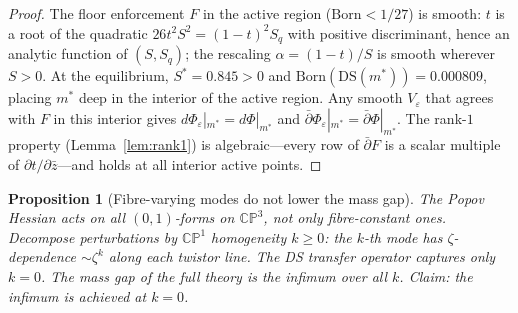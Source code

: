 \documentclass[11pt,a4paper]{article}
\newtheorem{proposition}[theorem]{Proposition}
\theoremstyle{definition}
\theoremstyle{remark}
\newcommand{\CP}{\mathbb{CP}}
\newcommand{\dbar}{\bar{\partial}}
\begin{document}
\begin{proof}
The floor enforcement $F$ in the active region ($\mathrm{Born}<1/27$) is smooth: $t$ is a root of the quadratic $26t^2S^2=(1-t)^2S_q$ with positive discriminant, hence an analytic function of $(S,S_q)$; the rescaling $\alpha=(1-t)/S$ is smooth wherever $S>0$. At the equilibrium, $S^*=0.845>0$ and $\mathrm{Born}(\mathrm{DS}(m^*))=0.000809$, placing $m^*$ deep in the interior of the active region. Any smooth $V_\varepsilon$ that agrees with $F$ in this interior gives $d\Phi_\varepsilon|_{m^*}=d\Phi|_{m^*}$ and $\dbar\Phi_\varepsilon|_{m^*}=\dbar\Phi|_{m^*}$. The rank-$1$ property (Lemma~\ref{lem:rank1}) is algebraic---every row of $\dbar F$ is a scalar multiple of $\partial t/\partial\bar{z}$---and holds at all interior active points.
\end{proof}

\begin{proposition}[Fibre-varying modes do not lower the mass gap]\label{prop:fibre_bound}
The Popov Hessian acts on all $(0,1)$-forms on $\CP^3$, not only fibre-constant ones. Decompose perturbations by $\CP^1$ homogeneity $k\geq 0$: the $k$-th mode has $\zeta$-dependence $\sim\zeta^k$ along each twistor line. The DS transfer operator captures only $k=0$. The mass gap of the full theory is the infimum over all $k$. Claim: the infimum is achieved at $k=0$.
\end{proposition}
\end{document}
